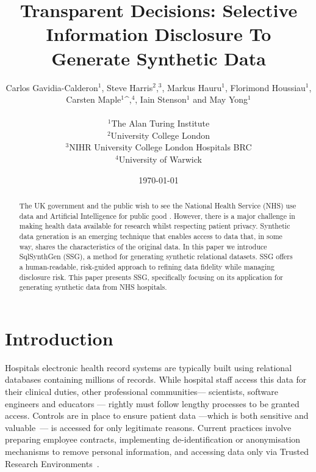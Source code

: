 \documentclass[11pt]{article}
\begin{document}
\title{Transparent Decisions: Selective Information Disclosure To Generate Synthetic Data}
\author{
Carlos Gavidia-Calderon$^1$, Steve Harris$^2$,$^3$, Markus Hauru$^1$, Florimond Houssiau$^1$, \\ Carsten Maple$^1$^,$^4$, Iain Stenson$^1$ and May Yong$^1$ \\~\\
$^1$The Alan Turing Institute \\
$^2$University College London \\ 
$^3$NIHR University College London Hospitals BRC \\
$^4$University of Warwick  \\
}
\date{\today} %
\maketitle
\begin{abstract}
The UK government and the public wish to see the National Health Service (NHS) use data and Artificial Intelligence for public good \cite{gov2022datasaves}\cite{Jones2022}. However, there is a major challenge in making health data available for research whilst respecting patient privacy. Synthetic data generation is an emerging technique that enables access to data that, in some way, shares the characteristics of the original data. In this paper we introduce SqlSynthGen (SSG), a method for generating synthetic relational datasets. SSG offers a human-readable, risk-guided approach to refining data fidelity while managing disclosure risk. This paper presents SSG, specifically focusing on its application for generating synthetic data from NHS hospitals.
\end{abstract}

\section{Introduction}

Hospitals electronic health record systems are typically built using relational databases containing millions of records. While hospital staff access this data for their clinical duties, other professional communities--- scientists, software engineers and educators --- rightly must follow lengthy processes to be granted access. Controls are in place to ensure patient data ---which is both sensitive and valuable~\cite{schomerus2022}--- is accessed for only legitimate reasons. Current practices involve preparing employee contracts, implementing de-identification or anonymisation mechanisms to remove personal information, and accessing data only via Trusted Research Environments~\cite{harris2022}.
\end{document}
